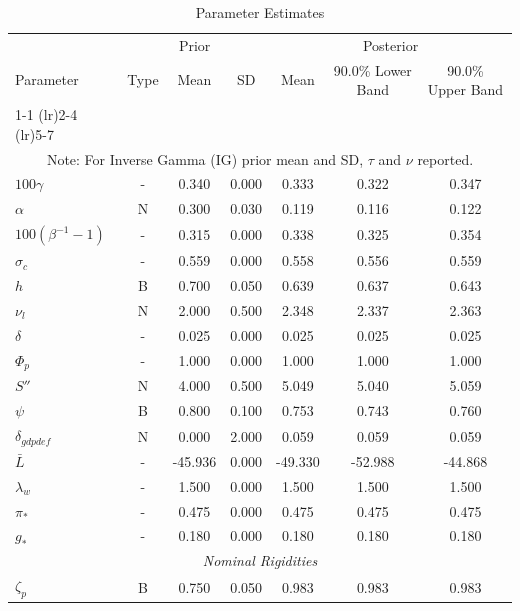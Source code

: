 \documentclass[12pt]{article}
\begin{document}
\pagestyle{empty}
\vspace*{.5cm}
{\small
\begin{longtable}{lcccccc}
\caption{Parameter Estimates}
\\ \hline
\multicolumn{1}{c}{} & \multicolumn{3}{c}{Prior} & \multicolumn{3}{c}{Posterior} \\
Parameter & Type & Mean & SD & Mean & 90.0\% {\tiny Lower Band} & 90.0\% {\tiny Upper Band} \\
\cmidrule(lr){1-1} \cmidrule(lr){2-4} \cmidrule(lr){5-7}
\endhead
\hline
\\ \multicolumn{7}{c}{\footnotesize Note: For Inverse Gamma (IG) prior mean and SD, $\tau$ and $\nu$ reported.}
\endfoot
\multicolumn{7}{c}{\textit{Steady State}} \\[3pt]
$100\gamma$ & - &    0.340 &    0.000 &    0.333 &    0.322 &    0.347 \\
$\alpha$ & N &    0.300 &    0.030 &    0.119 &    0.116 &    0.122 \\
$100(\beta^{-1} - 1)$ & - &    0.315 &    0.000 &    0.338 &    0.325 &    0.354 \\
$\sigma_{c}$ & - &    0.559 &    0.000 &    0.558 &    0.556 &    0.559 \\
$   h$ & B &    0.700 &    0.050 &    0.639 &    0.637 &    0.643 \\
$\nu_l$ & N &    2.000 &    0.500 &    2.348 &    2.337 &    2.363 \\
$\delta$ & - &    0.025 &    0.000 &    0.025 &    0.025 &    0.025 \\
$\Phi_p$ & - &    1.000 &    0.000 &    1.000 &    1.000 &    1.000 \\
$ S''$ & N &    4.000 &    0.500 &    5.049 &    5.040 &    5.059 \\
$\psi$ & B &    0.800 &    0.100 &    0.753 &    0.743 &    0.760 \\
$\delta_{gdpdef}$ & N &    0.000 &    2.000 &    0.059 &    0.059 &    0.059 \\
$\bar{L}$ & - &  -45.936 &    0.000 &  -49.330 &  -52.988 &  -44.868 \\
$\lambda_w$ & - &    1.500 &    0.000 &    1.500 &    1.500 &    1.500 \\
$\pi_*$ & - &    0.475 &    0.000 &    0.475 &    0.475 &    0.475 \\
$ g_*$ & - &    0.180 &    0.000 &    0.180 &    0.180 &    0.180 \\
\multicolumn{7}{c}{\textit{Nominal Rigidities}} \\[3pt]
$\zeta_p$ & B &    0.750 &    0.050 &    0.983 &    0.983 &    0.983 \\

\end{longtable}}
\end{document}
